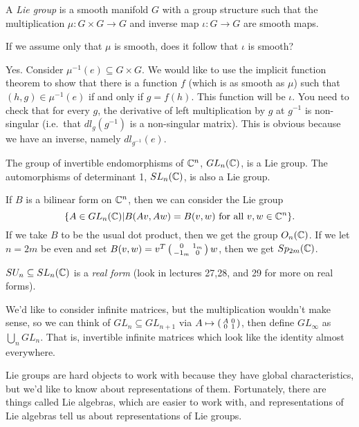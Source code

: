  \setcounter{lecture}{1}
  

 \begin{definition}
   A \emph{Lie group} is a smooth manifold $G$ with a group structure such that the
   multiplication $\mu:G\times G\to G$ and inverse map $\iota:G\to G$ are smooth maps.
 \end{definition}
 \begin{exercise}
   If we assume only that $\mu$ is smooth, does it follow that $\iota$ is smooth?
   \begin{solution}
     Yes. Consider $\mu^{-1}(e)\subseteq G\times G$. We would like to use the implicit
     function theorem to show that there is a function $f$ (which is as smooth as
     $\mu$) such that $(h,g)\in \mu^{-1}(e)$ if and only if $g=f(h)$. This function
     will be $\iota$. You need to check that for every $g$, the derivative of left
     multiplication by $g$ at $g^{-1}$ is non-singular (i.e.\ that $dl_{g}(g^{-1})$ is
     a non-singular matrix). This is obvious because we have an inverse, namely
     $dl_{g^{-1}}(e)$.
   \end{solution}
 \end{exercise}

 \begin{example}
   The group of invertible endomorphisms of $\mathbb{C}^n$, $GL_n(\mathbb{C})$, is a Lie group. The
   automorphisms of determinant 1, $SL_n(\mathbb{C})$, is also a Lie group.
 \end{example}
 \begin{example}
   If $B$ is a bilinear form on $\mathbb{C}^n$, then we can consider the Lie group
   \[
    \{ A\in GL_n(\mathbb{C})| B(Av,Aw)=B(v,w) \text{ for all }v,w\in \mathbb{C}^n \}.
   \]
   If we take $B$ to be the usual dot product, then we get the group $O_n(\mathbb{C})$. If we
   let $n=2m$ be even and set $B(v,w)= v^T \left( \begin{smallmatrix} 0 & 1_m \\ -1_m & 0 \end{smallmatrix} \right) w$, then we get
   $Sp_{2m}(\mathbb{C})$.
 \end{example}
 \begin{example}
   $SU_n\subseteq SL_n(\mathbb{C})$ is a \emph{real form} (look in lectures
   27,28, and 29 for more on real forms).
 \end{example}
 \begin{example}
   We'd like to consider infinite matrices, but the multiplication wouldn't make
 sense, so we can think of $GL_n\subseteq GL_{n+1}$ via $A\mapsto
 \left( \begin{smallmatrix} A & 0 \\ 0 & 1 \end{smallmatrix} \right)$, then define $GL_{\infty}$ as $\bigcup_n GL_n$. That is,
 invertible infinite matrices which look like the identity almost everywhere.
 \end{example}
 Lie groups are hard objects to work with because they have global characteristics,
 but we'd like to know about representations of them. Fortunately, there are things
 called Lie algebras, which are easier to work with, and representations of Lie
 algebras tell us about representations of Lie groups.

